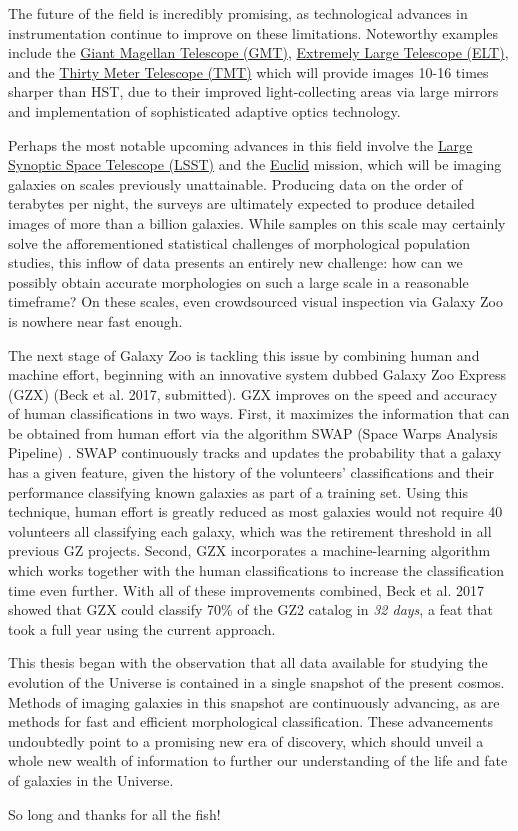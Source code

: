 The future of the field is incredibly promising, as technological advances in instrumentation continue to improve on these limitations. Noteworthy examples include the \href{http://www.gmto.org/}{Giant Magellan Telescope (GMT)}, \href{http://www.eso.org/public/teles-instr/elt/}{Extremely Large Telescope (ELT)}, and the \href{http://www.tmt.org/}{Thirty Meter Telescope (TMT)} which will provide images 10-16 times sharper than HST, due to their improved light-collecting areas via large mirrors and implementation of sophisticated adaptive optics technology. 

Perhaps the most notable upcoming advances in this field involve the \href{https://www.lsst.org/}{Large Synoptic Space Telescope (LSST)} and the \href{http://sci.esa.int/euclid/}{Euclid} mission, which will be imaging galaxies on scales previously unattainable. Producing data on the order of terabytes per night, the surveys are ultimately expected to produce detailed images of more than a billion galaxies. While samples on this scale may certainly solve the afforementioned statistical challenges of morphological population studies, this inflow of data presents an entirely new challenge: how can we possibly obtain accurate morphologies on such a large scale in a reasonable timeframe? On these scales, even crowdsourced visual inspection via Galaxy Zoo is nowhere near fast enough. 

The next stage of Galaxy Zoo is tackling this issue by combining human and machine effort, beginning with an innovative system dubbed Galaxy Zoo Express (GZX) (Beck et al. 2017, submitted). GZX improves on the speed and accuracy of human classifications in two ways. First, it maximizes the information that can be obtained from human effort via the algorithm SWAP (Space Warps Analysis Pipeline) \citep{Marshall2016}. SWAP continuously tracks and updates the probability that a galaxy has a given feature, given the history of the volunteers' classifications and their performance classifying known galaxies as part of a training set. Using this technique, human effort is greatly reduced as most galaxies would not require 40 volunteers all classifying each galaxy, which was the retirement threshold in all previous GZ projects. Second, GZX incorporates a machine-learning algorithm which works together with the human classifications to increase the classification time even further. With all of these improvements combined, Beck et al. 2017 showed that GZX could classify 70\% of the GZ2 catalog in \emph{32 days}, a feat that took a full year using the current approach. 

This thesis began with the observation that all data available for studying the evolution of the Universe is contained in a single snapshot of the present cosmos. Methods of imaging galaxies in this snapshot are continuously advancing, as are methods for fast and efficient morphological classification. These advancements undoubtedly point to a promising new era of discovery, which should unveil a whole new wealth of information to further our understanding of the life and fate of galaxies in the Universe.

So long and thanks for all the fish! 

 

